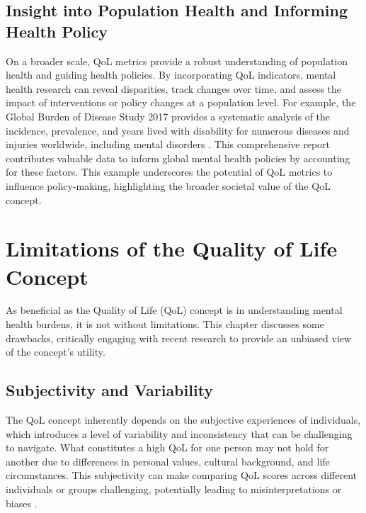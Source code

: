 \documentclass[10pt]{article}
\begin{document}
\begin{sloppypar}
  \subsection{Insight into Population Health and Informing Health Policy}
  \label{subsec:population-health}
  On a broader scale, QoL metrics provide a robust understanding of population health and guiding health policies. By incorporating QoL indicators, mental health research can reveal disparities, track changes over time, and assess the impact of interventions or policy changes at a population level.
  For example, the Global Burden of Disease Study 2017 provides a systematic analysis of the incidence, prevalence, and years lived with disability for numerous diseases and injuries worldwide, including mental disorders \citep{gbd_2017_disease_and_injury_incidence_and_prevalence_collaborators_global_2018}. This comprehensive report contributes valuable data to inform global mental health policies by accounting for these factors. This example underscores the potential of QoL metrics to influence policy-making, highlighting the broader societal value of the QoL concept.

  \section{Limitations of the Quality of Life Concept}
  \label{sec:limitations}

  As beneficial as the Quality of Life (QoL) concept is in understanding mental health burdens, it is not without limitations. This chapter discusses some drawbacks, critically engaging with recent research to provide an unbiased view of the concept's utility.

  \subsection{Subjectivity and Variability}
  \label{subsec:subjectivity}
  The QoL concept inherently depends on the subjective experiences of individuals, which introduces a level of variability and inconsistency that can be challenging to navigate. What constitutes a high QoL for one person may not hold for another due to differences in personal values, cultural background, and life circumstances. This subjectivity can make comparing QoL scores across different individuals or groups challenging, potentially leading to misinterpretations or biases \citep{skevington_expecting_2012}.


\end{sloppypar}
\end{document}
